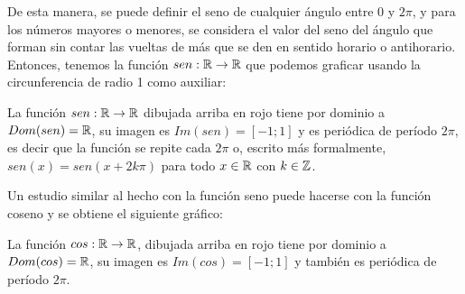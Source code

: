 \documentclass[../Teoría.root.tex]{subfiles}
\begin{document}
De esta manera, se puede definir el seno de cualquier ángulo entre 0 y \(2\pi\), y para los números mayores o menores, se considera el valor del seno del ángulo que forman sin contar las vueltas de más que se den en sentido horario o antihorario.
Entonces, tenemos la función \(sen : \mathbb{R} \rightarrow \mathbb{R}\) que podemos graficar usando la circunferencia de radio 1 como auxiliar:
\begin{center}
    \begin{scaletikzpicturetowidth}{\linewidth}
    \end{scaletikzpicturetowidth}
\end{center}
La función \(sen: \mathbb{R}\rightarrow\mathbb{R}\) dibujada arriba en rojo tiene por dominio a \(Dom(sen) = \mathbb{R}\), su imagen es \(Im(sen) = [−1; 1]\) y es periódica de período \(2\pi\), es decir que la función se repite cada \(2\pi\) o, escrito más formalmente, \(sen(x) = sen(x + 2k\pi)\) para todo \(x \in \mathbb{R}\) con \(k \in \mathbb{Z}\).

Un estudio similar al hecho con la función seno puede hacerse con la función coseno y se obtiene el siguiente gráfico:
\begin{center}
\end{center}
La función \(cos:\mathbb{R}\rightarrow\mathbb{R}\), dibujada arriba en rojo tiene por dominio a \(Dom(cos) = \mathbb{R}\), su imagen es \(Im(cos) = [−1; 1]\) y también es periódica de período \(2\pi\).
\end{document}
